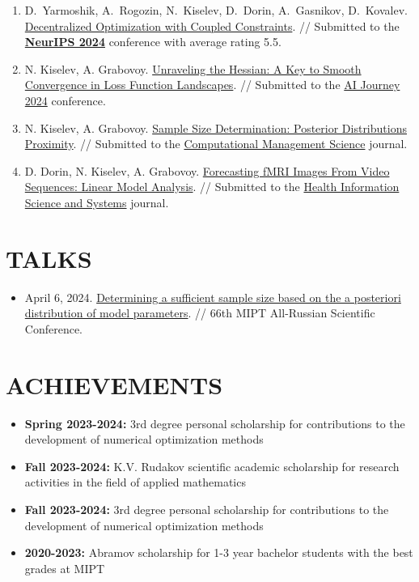 \documentclass[11pt,a4paper]{moderncv}
\begin{document}
\begin{minipage}[t]{0.62\textwidth}
\begin{enumerate}
    \item D.~Yarmoshik, A.~Rogozin, N.~Kiselev, D.~Dorin, A.~Gasnikov, D.~Kovalev. \href{https://arxiv.org/abs/2407.02020}{Decentralized Optimization with Coupled Constraints}. // Submitted to the \href{https://neurips.cc}{\textbf{NeurIPS 2024}} conference with average rating 5.5. 
    \item N. Kiselev, A. Grabovoy. \href{https://github.com/kisnikser/landscape-hessian}{Unraveling the Hessian: A Key to Smooth Convergence in Loss Function Landscapes}. // Submitted to the \href{https://aij.ru/eng}{AI Journey 2024} conference.
    \item N. Kiselev, A. Grabovoy. \href{https://github.com/kisnikser/Posterior-Distributions-Proximity}{Sample Size Determination: Posterior Distributions Proximity}. // Submitted to the \href{https://link.springer.com/journal/10287}{Computational Management Science} journal.
    \item D. Dorin, N. Kiselev, A. Grabovoy. \href{https://github.com/DorinDaniil/Forecasting-fMRI-Images}{Forecasting fMRI Images From Video Sequences: Linear Model Analysis}. // Submitted to the \href{https://link.springer.com/journal/13755}{Health Information Science and Systems} journal.
\end{enumerate}

\section{TALKS}

\begin{itemize}
\item April 6, 2024. \href{https://www.youtube.com/live/WnIRaRl730A?si=q0eScgnDP2ZidCpK&t=1723}{Determining a sufficient sample size based on the a posteriori distribution of model parameters}. // 66th MIPT All-Russian Scientific Conference.
\end{itemize}

\section{ACHIEVEMENTS}

\begin{itemize}
\item \textbf{Spring 2023-2024:} 3rd degree personal scholarship for contributions to the development of numerical optimization methods
\item \textbf{Fall 2023-2024:} K.V. Rudakov scientific academic scholarship for research activities in the field of applied mathematics
\item \textbf{Fall 2023-2024:} 3rd degree personal scholarship for contributions to the development of numerical optimization methods
\item \textbf{2020-2023:} Abramov scholarship for 1-3 year bachelor students with the best grades at MIPT
\end{itemize}


\end{minipage}
\end{document}

